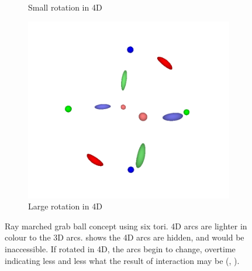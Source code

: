 \documentclass{l4proj}
\begin{document}
\begin{figure}
\begin{subfigure}[b]{0.33\textwidth}
    \caption{
      Small rotation in 4D
    }
    \label{fig:grab4}
  \end{subfigure}
  \begin{subfigure}[b]{0.33\textwidth}
    \includegraphics[width=\textwidth]{images/rotation/grabball-torii-split.PNG}
    \caption{
      Large rotation in 4D
    }
    \label{fig:grab5}
  \end{subfigure}
  \label{fig:grabballs-tori}
  \caption{
    Ray marched grab ball concept using six tori. 4D arcs are lighter in colour to the 3D arcs.  shows the 4D arcs are hidden, and would be inaccessible. If rotated in 4D, the arcs begin to change, overtime indicating less and less what the result of interaction may be (, ).
  }
\end{figure}

\end{document}
